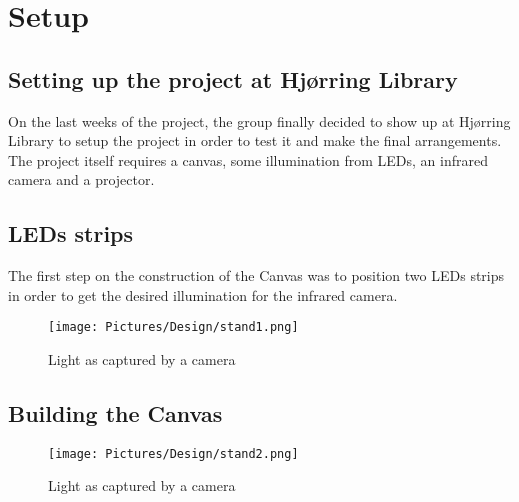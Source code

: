 \section{Setup}
\subsection{Setting up the project at Hj{\o}rring Library}
On the last weeks of the project, the group finally decided to show up at Hj{\o}rring Library to setup the project in order to test it and make the final arrangements. The project itself requires a canvas, some illumination from LEDs, an infrared camera and a projector.
\subsection{LEDs strips}
The first step on the construction of the Canvas was to position two LEDs strips in order to get the desired illumination for the infrared camera.
\begin{figure}[htbp] 
\centering 
\texttt{[image: Pictures/Design/stand1.png]} 
\caption{Light as captured by a camera} 
\label{fig:standPosition} 
\end{figure}
\subsection{Building the Canvas}

\begin{figure}[htbp] 
\centering 
\texttt{[image: Pictures/Design/stand2.png]} 
\caption{Light as captured by a camera} 
\label{fig:standPosition} 
\end{figure}